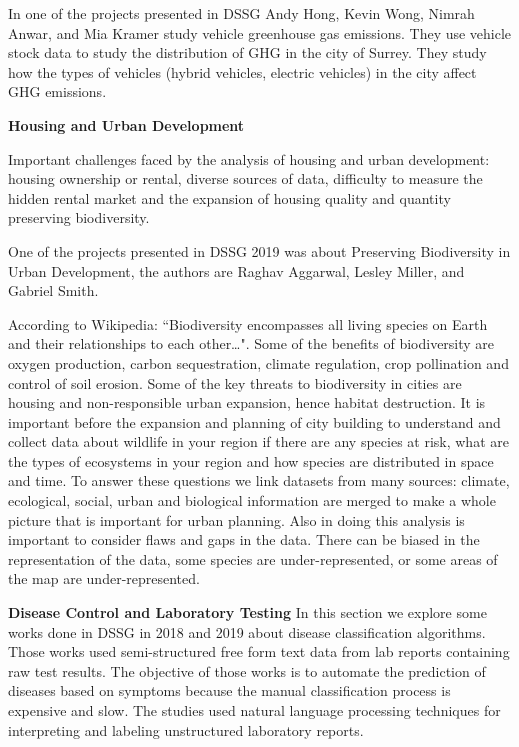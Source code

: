 \documentclass[9pt,a4paper]{article}
\begin{document}
In one of the projects presented in DSSG  Andy Hong, Kevin Wong,  Nimrah Anwar, and Mia Kramer study vehicle greenhouse gas emissions. They use vehicle stock data to study the distribution of GHG in the city of Surrey. They study how the types of vehicles (hybrid vehicles, electric vehicles) in the city affect GHG emissions. 


\textbf{Housing and Urban Development}

Important challenges faced by the analysis of housing and urban development: housing ownership or rental, diverse sources of data, difficulty to measure the hidden rental market and the expansion of housing quality and quantity preserving biodiversity.

One of the projects presented in DSSG 2019 was about Preserving Biodiversity in Urban Development, the authors are Raghav Aggarwal, Lesley Miller, and Gabriel Smith. 

According to Wikipedia: “Biodiversity encompasses all living species on Earth and their relationships to each other…". 
Some of the benefits of biodiversity are oxygen production, carbon sequestration, climate regulation, crop pollination and control of soil erosion. Some of the key threats to biodiversity in cities are housing and non-responsible urban expansion, hence habitat destruction.
It is important before the expansion and planning of city building to understand and collect data about wildlife in your region if there are any species at risk, what are the types of ecosystems in your region and how species are distributed in space and time. To answer these questions we link datasets from many sources: climate, ecological, social, urban and biological information are merged to make a whole picture that is important for urban planning. 
Also in doing this analysis is important to consider flaws and gaps in the data. There can be biased in the representation of the data, some species are under-represented, or some areas of the map are under-represented. 

\textbf{Disease Control and Laboratory Testing} In this section we explore some works done in DSSG in 2018 and 2019 about disease classification algorithms.
Those works used semi-structured free form text data from lab reports containing raw test results.
The objective of those works is to automate the prediction of diseases based on symptoms because the manual classification process is expensive and slow. The studies used natural language processing techniques for interpreting and labeling unstructured laboratory reports.
\end{document}
